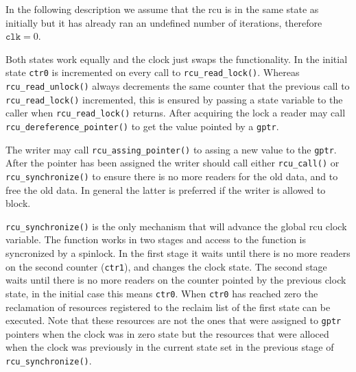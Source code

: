 In the following description we assume that the \acs{rcu} is in the same
state as initially but it has already ran an undefined number of iterations,
therefore $\mathtt{clk} = 0$.

Both states work equally and the clock just swaps the functionality. In the
initial state \verb+ctr0+ is incremented on every call to
\verb+rcu_read_lock()+. Whereas \verb+rcu_read_unlock()+ always decrements
the same counter that the previous call to \verb+rcu_read_lock()+ incremented,
this is ensured by passing a state variable to the caller when
\verb+rcu_read_lock()+ returns. After acquiring the lock a reader may call
\verb+rcu_dereference_pointer()+ to get the value pointed by a \verb+gptr+.

The writer may call \verb+rcu_assing_pointer()+ to assing a new value to the
\verb+gptr+. After the pointer has been assigned the writer should call either
\verb+rcu_call()+ or\\ \verb+rcu_synchronize()+ to ensure there is no more
readers for the old data, and to free the old data. In general the latter is
preferred if the writer is allowed to block.

\verb+rcu_synchronize()+ is the only mechanism that will advance the global
\acs{rcu} clock variable. The function works in two stages and access to the
function is syncronized by a spinlock. In the first stage it waits until
there is no more readers on the second counter (\verb+ctr1+), and changes the
clock state. The second stage waits until there is no more readers on the
counter pointed by the previous clock state, in the initial case this means
\verb+ctr0+. When \verb+ctr0+ has reached zero the reclamation of resources
registered to the reclaim list of the first state can be executed. Note that
these resources are not the ones that were assigned to \verb+gptr+ pointers
when the clock was in zero state but the resources that were alloced when the
clock was previously in the current state set in the previous stage of
\verb+rcu_synchronize()+.
